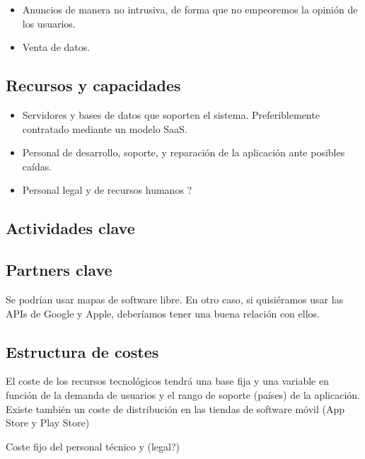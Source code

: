 \begin{itemize}
    \item Anuncios de manera no intrusiva, de forma que no empeoremos la opinión de los usuarios.
    \item Venta de datos.
\end{itemize}

\subsection{Recursos y capacidades}


\begin{itemize}
    \item Servidores y bases de datos que soporten el sistema. Preferiblemente contratado mediante un modelo SaaS.
    \item Personal de desarrollo, soporte, y reparación de la aplicación ante posibles caídas.
    \item Personal legal y de recursos humanos ?
\end{itemize}

\subsection{Actividades clave}


\subsection{Partners clave}


Se podrían usar mapas de software libre.
En otro caso, si quisiéramos usar las APIs de Google y Apple, deberíamos tener una buena relación con ellos.

\subsection{Estructura de costes}


El coste de los recursos tecnológicos tendrá una base fija y una variable en función de la demanda de usuarios y el rango de soporte (países) de la aplicación.
Existe también un coste de distribución en las tiendas de software móvil (App Store y Play Store)

Coste fijo del personal técnico y (legal?)
